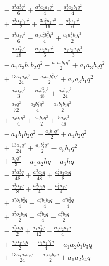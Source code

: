 \begin{align*}
&{}- \frac{a_{1}^{2} a_{2}^{2} q^{2}}{6} + \frac{a_{1}^{2} a_{2} a_{3} q^{2}}{4} - \frac{a_{1}^{2} a_{2} b_{1} q^{2}}{4}\\
&{}+ \frac{a_{1}^{2} a_{2} b_{3} q^{2}}{2} + \frac{3 a_{1}^{2} a_{2} q^{2}}{16} + \frac{a_{1}^{2} a_{3} q^{2}}{6}\\
&{}- \frac{a_{1}^{2} a_{5} q^{2}}{6} - \frac{a_{1} a_{2}^{2} b_{1}^{2} q^{2}}{4} + \frac{a_{1} a_{2}^{2} b_{1} q^{2}}{2}\\
&{}- \frac{a_{1} a_{2}^{2} q^{2}}{18} - \frac{a_{1} a_{2} a_{3} q^{2}}{6} + \frac{a_{1} a_{2} a_{4} q^{2}}{3}\\
&{}- a_{1} a_{3} b_{1} b_{2} q^{2} - \frac{a_{1} a_{3} b_{1} q^{2}}{2} + a_{1} a_{3} b_{2} q^{2}\\
&{}+ \frac{13 a_{1} a_{3} q^{2}}{24} - \frac{a_{2} a_{3} b_{1}^{2} q^{2}}{2} + a_{2} a_{3} b_{1} q^{2}\\
&{}- \frac{a_{2} a_{3} q^{2}}{3} - \frac{a_{2} b_{1}^{2} q^{2}}{48} + \frac{a_{2} b_{1} q^{2}}{24}\\
&{}- \frac{a_{2} q^{2}}{72} - \frac{a_{3} b_{1}^{2} q^{2}}{4} - \frac{a_{3} b_{1} b_{2} q^{2}}{2}\\
&{}+ \frac{a_{3} b_{1} q^{2}}{4} + \frac{a_{3} b_{2} q^{2}}{2} + \frac{5 a_{3} q^{2}}{48}\\
&{}- a_{4} b_{1} b_{2} q^{2} - \frac{a_{4} b_{1} q^{2}}{2} + a_{4} b_{2} q^{2}\\
&{}+ \frac{13 a_{4} q^{2}}{24} + \frac{a_{5} b_{1}^{2} q^{2}}{2} - a_{5} b_{1} q^{2}\\
&{}+ \frac{a_{5} q^{2}}{3} - a_{1} a_{2} h q - a_{3} h q\\
&{}- \frac{a_{1}^{3} a_{2}^{2} q}{48} + \frac{a_{1}^{3} a_{2} q}{48} + \frac{a_{1}^{2} a_{2} a_{3} q}{8}\\
&{}- \frac{a_{1}^{2} a_{2} q}{8} + \frac{a_{1}^{2} a_{3} q}{4} - \frac{a_{1}^{2} a_{5} q}{4}\\
&{}+ \frac{a_{1}^{2} b_{1} b_{2}^{2} q}{4} + \frac{a_{1}^{2} b_{1} b_{2} q}{4} - \frac{a_{1}^{2} b_{2}^{2} q}{4}\\
&{}+ \frac{a_{1}^{2} b_{2} b_{3} q}{2} - \frac{a_{1}^{2} b_{2} q}{4} + \frac{a_{1}^{2} b_{3} q}{2}\\
&{}- \frac{a_{1}^{2} b_{5} q}{2} + \frac{a_{1} a_{2}^{2} q}{12} - \frac{a_{1} a_{2} a_{3} q}{4}\\
&{}+ \frac{a_{1} a_{2} a_{4} q}{2} - \frac{a_{1} a_{2} b_{1}^{2} q}{4} + a_{1} a_{2} b_{1} b_{3} q\\
&{}+ \frac{13 a_{1} a_{2} b_{1} q}{24} - \frac{a_{1} a_{2} b_{3} q}{2} + a_{1} a_{2} b_{4} q\\

\end{align*}
